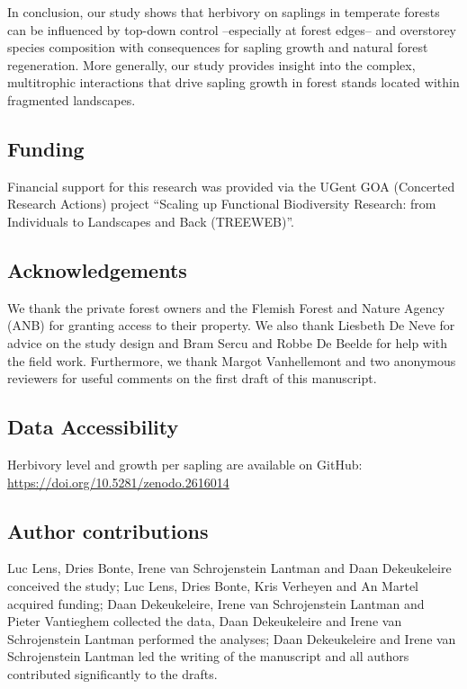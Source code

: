 \documentclass[10pt, twoside]{book} %
\begin{document}
	In conclusion, our study shows that herbivory on saplings in temperate forests can be influenced by top-down control --especially at forest edges-- and overstorey species composition with consequences for sapling growth and natural forest regeneration. More generally, our study provides insight into the complex, multitrophic interactions that drive sapling growth in forest stands located within fragmented landscapes.\\
	\clearpage

	\subsection*{Funding}
	
	Financial support for this research was provided via the UGent GOA (Concerted Research Actions) project  ``Scaling up Functional Biodiversity Research: from Individuals to Landscapes and Back (TREEWEB)''.

	\subsection*{Acknowledgements}
	
	We thank the private forest owners and the Flemish Forest and Nature Agency (ANB) for granting access to their property. We also thank Liesbeth De Neve for advice on the study design and Bram Sercu and Robbe De Beelde for help with the field work. Furthermore, we thank Margot Vanhellemont and two anonymous reviewers for useful comments on the first draft of this manuscript.

	\subsection*{Data Accessibility}
	Herbivory level and growth per sapling are available on GitHub: \url{https://doi.org/10.5281/zenodo.2616014}
	
	\subsection*{Author contributions}
	Luc Lens, Dries Bonte, Irene van Schrojenstein Lantman and Daan Dekeukeleire conceived the study; Luc Lens, Dries Bonte, Kris Verheyen and An Martel acquired funding; Daan Dekeukeleire, Irene van Schrojenstein Lantman and Pieter Vantieghem collected the data, Daan Dekeukeleire and Irene van Schrojenstein Lantman performed the analyses; Daan Dekeukeleire and Irene van Schrojenstein Lantman led the writing of the manuscript and all authors contributed significantly to the drafts.
	\clearpage
	
\end{document}
